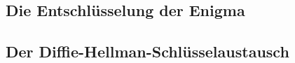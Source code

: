 \documentclass[a4paper,ngerman,12pt]{scrartcl}
\theoremstyle{definition}
\begin{document}
\subsection{Die Entschlüsselung der Enigma}


\subsection{Der Diffie-Hellman-Schlüsselaustausch}

\end{document}
